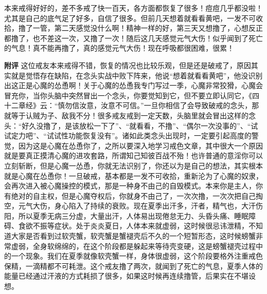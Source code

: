 \begin{case}
    本来戒得好好的，差不多戒了快一百天，各方面都恢复了很多！痘痘几乎都没啦！尤其是自己的底气足了好多，自信了很多。但前几天想着就看看黄吧，一发不可收拾，撸了一管，第二天感觉没什么啊！精神一样的好，第三天又想撸了，心想反正都撸了，也不差这一次，又撸了一次！随后这几天感觉元气大伤！似乎闻到了死亡的气息！真不能再撸了，真的感觉元气大伤！现在呼吸都很困难，很累！

    \textbf{附评} 这位戒友本来戒得不错，恢复的情况也比较乐观，但是还是破戒了，原因其实就是觉悟存在缺陷，在念头实战中败下阵来，他说“想着就看看黄吧”，他没识别出这正是心魔的怂恿啊！关于心魔的怂恿我专门写过一季，心魔非常狡猾，心魔会冒充你，当你头脑中突然冒出一个念头，你要觉知到它，但不要立即认同它，《四十二章经》云：“慎勿信汝意，汝意不可信。”一旦你相信了会导致破戒的念头，那就等于认贼为子、敌我不分！很多戒友戒到一定天数，头脑里就会冒出这样的念头：“好久没撸了，是该放松一下了”、“就看看，不撸”、“偶尔一次没事的”、“试试定力吧”、“试试性功能恢复没有”。诸如此类念头出现时，一定要引起高度的警觉，因为这是心魔在怂恿你了，之所以要深入地学习戒色文章，其中很大一个原因就是要真正摸清心魔的进攻套路，所谓知己知彼百战不殆！也许普通的意淫你可以立刻斩断，但是心魔一怂恿，你就无法识别了，你还以为是自己的想法，其实根本就是心魔在怂恿你！一旦破戒，基本都是一发不可收拾，重新沦为了心魔的奴隶，会再次进入被心魔操控的模式，那是一种身不由己的自毁模式。本来你是主人，你有绝对的自主权，但是心魔夺权后，你就身不由己了，一次次撸，一次次把自己掏空，元气大伤，身心陷入了持续的衰败。现在夏季出汗多，汗者，精气也，大汗伤阳，所以夏季无病三分虚，大量出汗，人体易出现倦怠无力、头昏头痛、睡眠障碍、食欲不振等症状。处于炎炎夏日，人体本来就虚弱，这时候很忌讳泄精，不知道大家是否看到过软壳蟹，软壳蟹是蟹褪壳后不久的一个短暂形态，这时候螃蟹非常虚弱，全身软绵绵的，在这个阶段都是躲起来等待壳变硬，这是螃蟹褪壳过程中的一个现象。我们在夏季就像软壳蟹一样，身体很虚弱，这个阶段要格外注重戒色保精，一滴精都不可耗泄。这个戒友撸了两次，就闻到了死亡的气息，夏季人体的能量已经通过汗液的方式耗损了很多，如果这时候再连续撸管，后果实在不堪设想。
\end{case}

